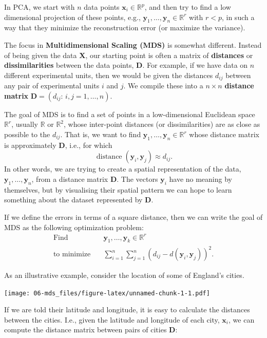 \documentclass[]{book}
\theoremstyle{definition}
\theoremstyle{definition}
\theoremstyle{definition}
\theoremstyle{remark}
\begin{document}
In PCA, we start with \(n\) data points \(\mathbf x_i \in \mathbb{R}^p\), and then try to find a low dimensional projection of these points, e.g., \(\mathbf y_1, \ldots, \mathbf y_n \in \mathbb{R}^r\) with \(r<p\), in such a way that they minimize the reconstruction error (or maximize the variance).

The focus in \textbf{Multidimensional Scaling (MDS)} is somewhat different. Instead of being given the data \(\mathbf X\), our starting point is often a matrix of \textbf{distances} or \textbf{dissimilarities} between the data points, \(\mathbf D\). For example, if we have data on \(n\) different experimental units, then we would be given the distances \(d_{ij}\) between any pair of experimental units \(i\) and \(j\). We compile these into a \(n\times n\) \textbf{distance matrix} \(\mathbf D=(d_{ij}: \, i,j=1, \ldots , n)\).

The goal of MDS is to find a set of points in a low-dimensional Euclidean space \(\mathbb{R}^r\), usually \(\mathbb{R}\) or \(\mathbb{R}^2\), whose inter-point distances (or dissimilarities) are as close as possible to the \(d_{ij}\). That is, we want to find \(\mathbf y_1, \ldots, \mathbf y_n \in \mathbb{R}^r\) whose distance matrix is approximately \(\mathbf D\), i.e., for which
\[\operatorname{distance}(\mathbf y_i, \mathbf y_j) \approx d_{ij}.\]
In other words, we are trying to create a spatial representation of the data, \(\mathbf y_1, \ldots, \mathbf y_n\), from a distance matrix \(\mathbf D\). The vectors \(\mathbf y_i\) have no meaning by themselves, but by visualising their spatial pattern we can hope to learn something about the dataset represented by \(\mathbf D\).

If we define the errors in terms of a square distance, then we can write the goal of MDS as the following optimization problem:
\begin{align}
\mbox{Find} \quad& \mathbf y_1, \ldots, \mathbf y_k \in \mathbb{R}^r\\
\mbox{to minimize} \quad &\sum_{i=1}^n \sum_{j=1}^n (d_{ij} - d(\mathbf y_i, \mathbf y_j))^2.\label{eq:mdsopt}
\end{align}

As an illustrative example, consider the location of some of England's cities.

\texttt{[image: 06-mds\_files/figure-latex/unnamed-chunk-1-1.pdf]}

If we are told their latitude and longitude, it is easy to calculate the distances between the cities. I.e., given the latitude and longitude of each city, \(\mathbf x_i\), we can compute the distance matrix between pairs of cities \(\mathbf D\):
\end{document}
